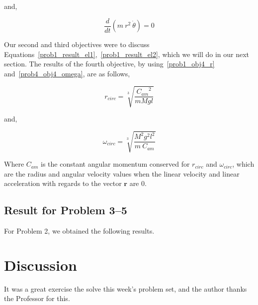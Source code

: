 \documentclass[conference]{IEEEtran}
\begin{document}
and,

\begin{equation}\label{prob1_result_el2}
    \boxed{
        \frac{d}{dt}\left( m~r^2~\dot{\theta} \right) = 0
    }
\end{equation}

Our second and third objectives were to discuss Equations~\ref{prob1_result_el1},~\ref{prob1_result_el2},
which we will do in our next section. The results of the fourth objective, by using~\ref{prob1_obj4_r}
and~\ref{prob4_obj4_omega}, are as follows,

\begin{equation}
    \boxed{r_{circ} = \sqrt[3]{\frac{{C_{am}}^2}{mMgl}}}
\end{equation}

and,

\begin{equation}
    \boxed{\omega_{circ} = \sqrt[3]{\frac{M^2g^2l^2}{m~C_{am}}}}
\end{equation}

Where $C_{am}$ is the constant angular momentum conserved for $r_{circ}$ and $\omega_{circ}$,
which are the radius and angular velocity values when the linear velocity and linear acceleration with
regards to the vector $\textbf{r}$ are 0.

\subsection{Result for Problem 3--5}

For Problem 2, we obtained the following results.

\section{Discussion}

It was a great exercise the solve this week's problem set, and the author thanks
the Professor for this.


\end{document}
